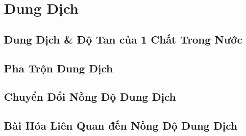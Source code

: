 \documentclass{article}
\numberwithin{equation}{section}
\begin{document}
\section{Dung Dịch}

\subsection{Dung Dịch \& Độ Tan của 1 Chất Trong Nước}


\subsection{Pha Trộn Dung Dịch}


\subsection{Chuyển Đổi Nồng Độ Dung Dịch}


\subsection{Bài Hóa Liên Quan đến Nồng Độ Dung Dịch}


\printbibliography[heading=bibintoc]
	
\end{document}

